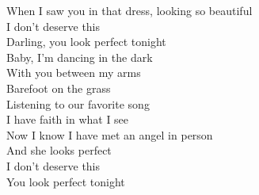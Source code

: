 \documentclass[]{article} %
\begin{document}
When I saw you in that dress, looking so beautiful\\
I don't deserve this\\
Darling, you look perfect tonight\\
Baby, I'm dancing in the dark\\
With you between my arms\\
Barefoot on the grass\\
Listening to our favorite song\\
I have faith in what I see\\
Now I know I have met an angel in person\\
And she looks perfect\\
I don't deserve this\\
You look perfect tonight\\
\end{document}
